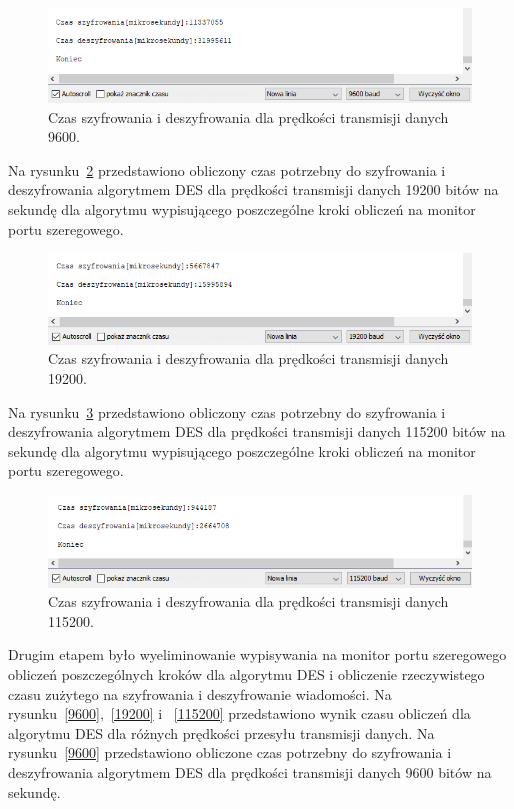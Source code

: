 \documentclass[12p]{article}
\begin{document}
\begin{figure}[H]
\centering
\includegraphics[width=12cm]{szy_desz_9600_print.png}
\caption{Czas szyfrowania i deszyfrowania dla prędkości transmisji danych 9600.}\label{9600_print}
\end{figure}

Na rysunku~\ref{19200_print} przedstawiono obliczony czas potrzebny do szyfrowania i deszyfrowania algorytmem DES dla prędkości transmisji danych 19200 bitów na sekundę dla algorytmu wypisującego poszczególne kroki obliczeń na monitor portu szeregowego. 

\begin{figure}[H]
\centering
\includegraphics[width=12cm]{szy_desz_19200_print.png}
\caption{Czas szyfrowania i deszyfrowania dla prędkości transmisji danych 19200.}\label{19200_print}
\end{figure}

Na rysunku~\ref{115200_print} przedstawiono obliczony czas potrzebny do szyfrowania i deszyfrowania algorytmem DES dla prędkości transmisji danych 115200 bitów na sekundę dla algorytmu wypisującego poszczególne kroki obliczeń na monitor portu szeregowego.

\begin{figure}[H]
\centering
\includegraphics[width=12cm]{szy_desz_115200_print.png}
\caption{Czas szyfrowania i deszyfrowania dla prędkości transmisji danych 115200.}\label{115200_print}
\end{figure}

Drugim etapem było wyeliminowanie wypisywania na monitor portu szeregowego obliczeń poszczególnych kroków dla algorytmu DES i obliczenie rzeczywistego czasu zużytego na szyfrowania i deszyfrowanie wiadomości. Na rysunku~\ref{9600},~\ref{19200} i ~\ref{115200} przedstawiono wynik czasu obliczeń dla algorytmu DES dla różnych prędkości przesyłu transmisji danych. Na rysunku~\ref{9600} przedstawiono obliczone czas potrzebny do szyfrowania i deszyfrowania algorytmem DES dla prędkości transmisji danych 9600 bitów na sekundę.
\end{document}
